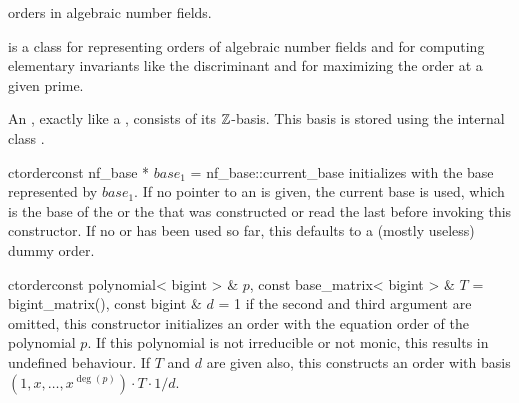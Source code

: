 
\newcommand{\Q}{\mathcal{Q}}



\NAME

 \dotfill orders in algebraic number fields.


\ABSTRACT

 is a class for representing orders of algebraic number fields and for computing
elementary invariants like the discriminant and for maximizing the order at a given prime.



\DESCRIPTION \label{order_description}

An , exactly like a , consists of its $\mathbb{Z}$-basis.  This basis
is stored using the internal class .



\CONS

\begin{fcode}{ct}{order}{const nf_base * $\mathit{base}_1$ = nf_base::current_base}
  initializes with the base represented by $\mathit{base}_1$.  If no pointer to an
   is given, the current base is used, which is the base of the
   or the  that was constructed or read the last before invoking
  this constructor.  If no  or  has been used so far, this
  defaults to a (mostly useless) dummy order.
\end{fcode}

\begin{fcode}{ct}{order}{const polynomial< bigint > & $p$,
    const base_matrix< bigint > & $T$ = bigint_matrix(), const bigint & $d$ = 1}%
  if the second and third argument are omitted, this constructor initializes an order with the
  equation order of the polynomial $p$.  If this polynomial is not irreducible or not monic,
  this results in undefined behaviour.  If $T$ and $d$ are given also, this constructs an order
  with basis $(1, x, \dots, x^{\deg(p)}) \cdot T \cdot 1 / d$.
\end{fcode}

